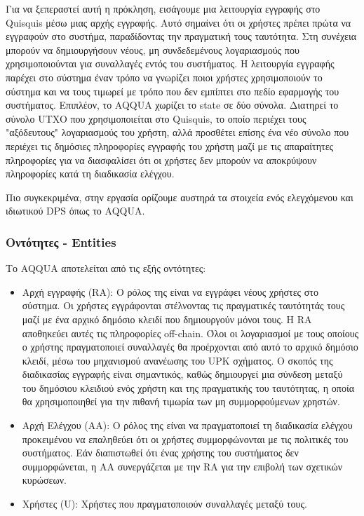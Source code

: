 Για να ξεπεραστεί αυτή η πρόκληση, εισάγουμε μια λειτουργία εγγραφής στο Quisquis μέσω μιας αρχής εγγραφής. Αυτό σημαίνει ότι οι χρήστες πρέπει πρώτα να εγγραφούν στο συστήμα, παραδίδοντας την πραγματική τους ταυτότητα. Στη συνέχεια μπορούν να δημιουργήσουν νέους, μη συνδεδεμένους λογαριασμούς που χρησιμοποιούνται για συναλλαγές εντός του συστήματος. Η λειτουργία εγγραφής παρέχει στο σύστημα έναν τρόπο να γνωρίζει ποιοι χρήστες χρησιμοποιούν το σύστημα και να τους τιμωρεί με τρόπο που δεν εμπίπτει στο πεδίο εφαρμογής του συστήματος. Επιπλέον, το AQQUA χωρίζει το state σε δύο σύνολα. Διατηρεί το σύνολο UTXO που χρησιμοποιείται στο Quisquis, το οποίο περιέχει τους "αξόδευτους" λογαριασμούς του χρήστη, αλλά προσθέτει επίσης ένα νέο σύνολο που περιέχει τις δημόσιες πληροφορίες εγγραφής του χρήστη μαζί με τις απαραίτητες πληροφορίες για να διασφαλίσει ότι οι χρήστες δεν μπορούν να αποκρύψουν πληροφορίες κατά τη διαδικασία ελέγχου.

Πιο συγκεκριμένα, στην εργασία ορίζουμε αυστηρά τα στοιχεία ενός ελεγχόμενου και ιδιωτικού DPS όπως το AQQUA.

\subsubsection{Οντότητες - Entities}
Το AQQUA αποτελείται από τις εξής οντότητες:
\begin{itemize}
    \item Αρχή εγγραφής (RA): Ο ρόλος της  είναι να εγγράφει νέους χρήστες στο σύστημα. Οι χρήστες εγγράφονται στέλνοντας τις πραγματικές ταυτότητάς τους μαζί με ένα αρχικό δημόσιο κλειδί που δημιουργούν μόνοι τους. Η RA αποθηκεύει αυτές τις πληροφορίες off-chain. Όλοι οι λογαριασμοί με τους οποίους ο χρήστης πραγματοποιεί συναλλαγές θα προέρχονται από αυτό το αρχικό δημόσιο κλειδί, μέσω του μηχανισμού ανανέωσης του UPK σχήματος. Ο σκοπός της διαδικασίας εγγραφής είναι σημαντικός, καθώς δημιουργεί μια σύνδεση μεταξύ του δημόσιου κλειδιού ενός χρήστη και της πραγματικής του ταυτότητας, η οποία θα χρησιμοποιηθεί για την πιθανή τιμωρία των μη συμμορφούμενων χρηστών.
    \item Αρχή Ελέγχου (ΑΑ): Ο ρόλος της είναι να πραγματοποιεί τη διαδικασία ελέγχου προκειμένου να επαληθεύει ότι οι χρήστες συμμορφώνονται με τις πολιτικές του συστήματος. Εάν διαπιστωθεί ότι ένας χρήστης του συστήματος δεν συμμορφώνεται, η ΑΑ συνεργάζεται με την RA για την επιβολή των σχετικών κυρώσεων.
    \item Χρήστες (U): Χρήστες που πραγματοποιούν συναλλαγές μεταξύ τους.
\end{itemize}


